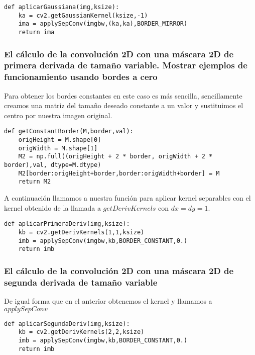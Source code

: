 \documentclass{article}
\newcommand{\img}[2]{
\noindent\makebox[\textwidth][c]{\texttt{[image: \#1]}}%
}
\begin{document}
\begin{lstlisting}
def aplicarGaussiana(img,ksize):
    ka = cv2.getGaussianKernel(ksize,-1)
    ima = applySepConv(imgbw,(ka,ka),BORDER_MIRROR)
    return ima
\end{lstlisting}

\img{eximg/ej4}{0.8}

\subsubsection{El cálculo de la convolución 2D con una máscara 2D de primera derivada de tamaño variable. Mostrar ejemplos de funcionamiento usando bordes a cero}

Para obtener los bordes constantes en este caso es más sencilla, sencillamente creamos una matriz del tamaño deseado constante a un valor y sustituimos el centro por nuestra imagen original.

\begin{lstlisting}
def getConstantBorder(M,border,val):
    origHeight = M.shape[0]
    origWidth = M.shape[1]
    M2 = np.full((origHeight + 2 * border, origWidth + 2 * border),val, dtype=M.dtype)
    M2[border:origHeight+border,border:origWidth+border] = M
    return M2
\end{lstlisting}

A continuación llamamos a nuestra función para aplicar kernel separables con el kernel obtenido de la llamada a $getDerivKernels$ con $dx=dy=1$.

\img{eximg/ej5_k}{0.8}

\begin{lstlisting}
def aplicarPrimeraDeriv(img,ksize):
	kb = cv2.getDerivKernels(1,1,ksize)
	imb = applySepConv(imgbw,kb,BORDER_CONSTANT,0.)
	return imb
\end{lstlisting}

\img{eximg/ej5}{0.8}

\subsubsection{El cálculo de la convolución 2D con una máscara 2D de segunda derivada de tamaño variable}

De igual forma que en el anterior obtenemos el kernel y llamamos a $applySepConv$

\img{eximg/ej6_k}{0.8}

\begin{lstlisting}
def aplicarSegundaDeriv(img,ksize):
	kb = cv2.getDerivKernels(2,2,ksize)
	imb = applySepConv(imgbw,kb,BORDER_CONSTANT,0.)
	return imb
\end{lstlisting}
\end{document}
